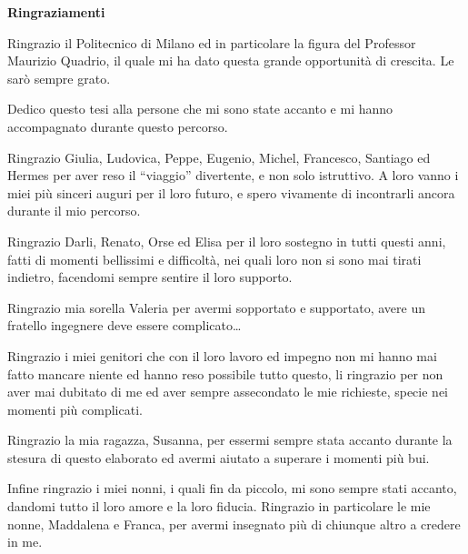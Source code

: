 \documentclass[a4paper,twosides,openright,titlepage]{book}
\newenvironment{abstract}%
	{\cleardoublepage%
		\thispagestyle{empty}%
		\null \vfill\begin{center}%
		\bfseries \abstractname \end{center}}%
	{\vfill\null}
\begin{document}
\renewcommand{\abstractname}{Ringraziamenti}
\begin{abstract}
\hrulefill

Ringrazio il Politecnico di Milano ed in particolare la figura del Professor Maurizio Quadrio, il quale mi ha dato questa grande opportunità di crescita. Le sarò sempre grato.\par
Dedico questo tesi alla persone che mi sono state accanto e mi hanno accompagnato durante questo percorso. \par
Ringrazio Giulia, Ludovica, Peppe, Eugenio, Michel, Francesco, Santiago ed Hermes per aver reso il ``viaggio'' divertente, e non solo istruttivo.
A loro vanno i miei più sinceri auguri per il loro futuro, e spero vivamente di incontrarli ancora durante il mio percorso.\par
Ringrazio Darli, Renato, Orse ed Elisa per il loro sostegno in tutti questi anni, fatti di momenti bellissimi e difficoltà, nei quali loro non si sono mai tirati indietro, facendomi sempre sentire il loro supporto.\par
Ringrazio mia sorella Valeria per avermi sopportato e supportato, avere un fratello ingegnere deve essere complicato\dots \par
Ringrazio i miei genitori che con il loro lavoro ed impegno non mi hanno mai fatto mancare niente ed hanno reso possibile tutto questo, li ringrazio per non aver mai dubitato di me ed aver sempre assecondato le mie richieste, specie nei momenti più complicati.\par
Ringrazio la mia ragazza, Susanna, per essermi sempre stata accanto durante la stesura di questo elaborato ed avermi aiutato a superare i momenti più bui.

Infine ringrazio i miei nonni, i quali fin da piccolo, mi sono sempre stati accanto, dandomi tutto il loro amore e la loro fiducia. Ringrazio in particolare le mie nonne, Maddalena e Franca, per avermi insegnato più di chiunque altro a credere in me.\par
\hrulefill
\end{abstract}




\tableofcontents 



\mainmatter












%



\backmatter
{} 
\printbibliography
\end{document}
